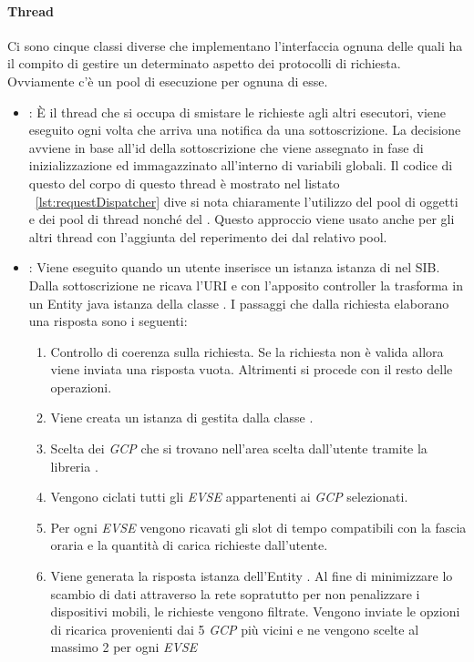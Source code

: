 \paragraph{Thread}\label{par:thread}

Ci sono cinque classi diverse che implementano l'interfaccia  ognuna delle quali ha il compito di gestire un determinato aspetto dei protocolli di richiesta. Ovviamente c'è un pool di esecuzione per ognuna di esse.

\begin{itemize}
	\item {}: È il thread che si occupa di smistare le richieste agli altri esecutori, viene eseguito ogni volta che arriva una notifica da una sottoscrizione. La decisione avviene in base all'id della sottoscrizione che viene assegnato in fase di inizializzazione ed immagazzinato all'interno di variabili globali. Il codice di questo del corpo di questo thread è mostrato nel listato ~\ref{lst:requestDispatcher} dive si nota chiaramente l'utilizzo del pool di oggetti e dei pool di thread nonché del . Questo approccio viene usato anche per gli altri thread con l'aggiunta del reperimento dei  dal relativo pool.
	\item {}: Viene eseguito quando un utente inserisce un istanza istanza di  nel SIB. Dalla sottoscrizione ne ricava l'URI e con l'apposito controller  la trasforma in un Entity java istanza della classe . I passaggi che dalla richiesta elaborano una risposta sono i seguenti:
	\begin{enumerate}
		\item Controllo di coerenza sulla richiesta. Se la richiesta non è valida allora viene inviata una risposta vuota. Altrimenti si procede con il resto delle operazioni.
		\item Viene creata un istanza di  gestita dalla classe .
		\item Scelta dei \emph{GCP} che si trovano nell'area scelta dall'utente tramite la libreria .
		\item Vengono ciclati tutti gli \emph{EVSE} appartenenti ai \emph{GCP} selezionati.
		\item Per ogni \emph{EVSE} vengono ricavati gli slot di tempo compatibili con la fascia oraria e la quantità di carica richieste dall'utente.
		\item Viene generata la risposta istanza dell'Entity . Al fine di minimizzare lo scambio di dati attraverso la rete sopratutto per non penalizzare i dispositivi mobili, le richieste vengono filtrate. Vengono inviate le opzioni di ricarica provenienti dai 5 \emph{GCP} più vicini e ne vengono scelte al massimo 2 per ogni \emph{EVSE}

\end{enumerate}
\end{itemize}
